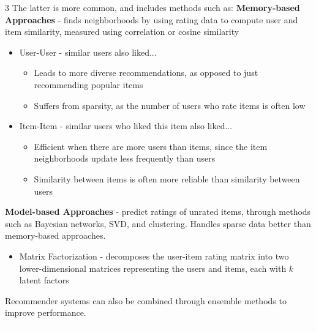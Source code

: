 \documentclass[10pt,landscape]{article}
\begin{document}
\begin{multicols}{3}
    The latter is more common, and includes methods such as:
    \textbf{Memory-based Approaches} - finds neighborhoods by using rating data to compute user and item similarity, measured using correlation or cosine similarity

    \begin{itemize}[label={--},leftmargin=4mm]
        \itemsep -.4mm
        \item User-User - similar users also liked...
              \begin{itemize}[label={--},leftmargin=4mm]
                  \vspace{-1mm}
                  \itemsep -.4mm
                  \item Leads to more diverse recommendations, as opposed to just recommending popular items
                  \item Suffers from sparsity, as the number of users who rate items is often low
              \end{itemize}
              \vspace{-1mm}
        \item Item-Item - similar users who liked this item also liked...
              \begin{itemize}[label={--},leftmargin=4mm]
                  \itemsep -.4mm
                        \vspace{-1.5mm}
                  \item Efficient when there are more users than items, since the item neighborhoods update less frequently than users
                  \item Similarity between items is often more reliable than similarity between users
              \end{itemize}
    \end{itemize}
    \vspace{-1.5mm}
    \smallskip
    \textbf{Model-based Approaches} - predict ratings of unrated items, through methods such as Bayesian networks, SVD, and clustering. Handles sparse data better than memory-based approaches.\\
    \begin{itemize}[label={--},leftmargin=4mm]
        \itemsep -.4mm
              \vspace{-.5mm}
        \item Matrix Factorization - decomposes the user-item rating matrix into two lower-dimensional matrices representing the users and items, each with $k$ latent factors
    \end{itemize}
    \smallskip
    \vspace{-1mm}
    Recommender systems can also be combined through ensemble methods to improve performance.
    \\\textcolor{white}{.}\vspace{-3mm}\\ %

\end{multicols}
\end{document}
